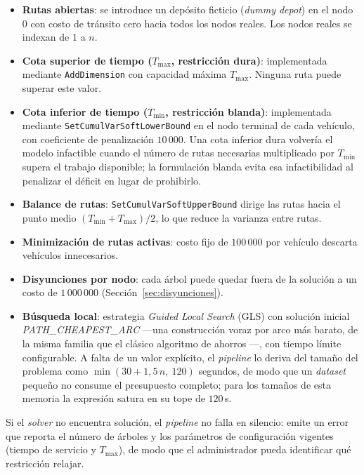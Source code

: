 \begin{itemize}
  \item \textbf{Rutas abiertas}: se introduce un depósito ficticio (\textit{dummy depot})
        en el nodo 0 con costo de tránsito cero hacia todos los nodos reales.
        Los nodos reales se indexan de $1$ a $n$.
  \item \textbf{Cota superior de tiempo ($T_{\max}$, restricción dura)}:
        implementada mediante \texttt{AddDimension} con capacidad máxima $T_{\max}$.
        Ninguna ruta puede superar este valor.
  \item \textbf{Cota inferior de tiempo ($T_{\min}$, restricción blanda)}:
        implementada mediante \texttt{SetCumulVarSoftLowerBound} en el nodo terminal
        de cada vehículo, con coeficiente de penalización $10\,000$.
        Una cota inferior dura volvería el modelo infactible cuando el número de rutas
        necesarias multiplicado por $T_{\min}$ supera el trabajo disponible; la
        formulación blanda evita esa infactibilidad al penalizar el déficit en lugar de
        prohibirlo.
  \item \textbf{Balance de rutas}:
        \texttt{SetCumulVarSoftUpperBound} dirige las rutas hacia el punto medio
        $(T_{\min} + T_{\max})/2$, lo que reduce la varianza entre rutas.
  \item \textbf{Minimización de rutas activas}:
        costo fijo de $100\,000$ por vehículo descarta vehículos innecesarios.
  \item \textbf{Disyunciones por nodo}:
        cada árbol puede quedar fuera de la solución a un costo de
        $1\,000\,000$ (Sección~\ref{sec:disyunciones}).
  \item \textbf{Búsqueda local}:
        estrategia \textit{Guided Local Search} (GLS)
        \citep{voudouris1999guided} con solución inicial
        \textit{PATH\_CHEAPEST\_ARC} ---una construcción voraz por arco más barato,
        de la misma familia que el clásico algoritmo de ahorros
        \citep{clarke1964scheduling}---, con tiempo límite configurable. A falta de
        un valor explícito, el \textit{pipeline} lo deriva del tamaño del problema
        como $\min(30 + 1{,}5\,n,\ 120)$ segundos, de modo que un \textit{dataset}
        pequeño no consume el presupuesto completo; para los tamaños de esta
        memoria la expresión satura en su tope de $120$\,s.
\end{itemize}

Si el \textit{solver} no encuentra solución, el \textit{pipeline} no falla en silencio: emite
un error que reporta el número de árboles y los parámetros de configuración vigentes
(tiempo de servicio y $T_{\max}$), de modo que el administrador pueda identificar qué
restricción relajar.

